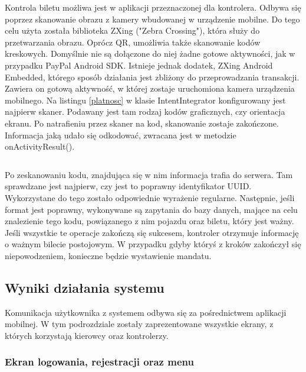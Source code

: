 Kontrola biletu możliwa jest w aplikacji przeznaczonej dla kontrolera. Odbywa się poprzez skanowanie obrazu z kamery wbudowanej w urządzenie mobilne. Do tego celu użyta została biblioteka ZXing ("Zebra Crossing"), która służy do przetwarzania obrazu. Oprócz QR, umożliwia także skanowanie kodów kreskowych. Domyślnie nie są dołączone do niej żadne gotowe aktywności, jak w przypadku PayPal Android SDK. Istnieje jednak dodatek, ZXing Android Embedded, którego sposób działania jest zbliżony do przeprowadzania transakcji. Zawiera on gotową aktywność, w której zostaje uruchomiona kamera urządzenia mobilnego. Na listingu \ref{platnosc} w klasie IntentIntegrator konfigurowany jest najpierw skaner. Podawany jest tam rodzaj kodów graficznych, czy orientacja ekranu. Po natrafieniu przez skaner na kod, skanowanie zostaje zakończone. Informacja jaką udało się odkodować, zwracana jest w metodzie onActivityResult().

\begin{singlespace}
	\label{platnosc}
	\vspace{0.3cm}
	\inputminted[fontsize=\footnotesize, linenos=true]{java}{src/imp/start-scan.java}
\end{singlespace}

Po zeskanowaniu kodu, znajdująca się w nim informacja trafia do serwera. Tam sprawdzane jest najpierw, czy jest to poprawny identyfikator UUID. Wykorzystane do tego zostało odpowiednie wyrażenie regularne. Następnie, jeśli format jest poprawny, wykonywane są zapytania do bazy danych, mające na celu znalezienie tego kodu, powiązanego z nim pojazdu oraz biletu, który jest ważny. Jeśli wszystkie te operacje zakończą się sukcesem, kontroler otrzymuje informację o ważnym bilecie postojowym. W przypadku gdyby któryś z kroków zakończył się niepowodzeniem, konieczne będzie wystawienie mandatu. 

\newpage
\subsection{Wyniki działania systemu}

Komunikacja użytkownika z systemem odbywa się za pośrednictwem aplikacji mobilnej. W tym podrozdziale zostały zaprezentowane wszystkie ekrany, z których korzystają kierowcy oraz kontrolerzy. 

\subsubsection*{Ekran logowania, rejestracji oraz menu}

